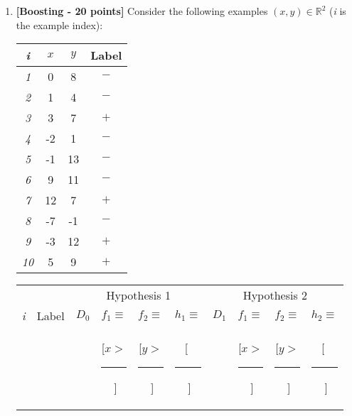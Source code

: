 \begin{enumerate}
\item {\bf [Boosting - 20 points]}
  Consider the following examples $(x,y) \in \mathbb{R}^2$ ({\em i} is the example index):
  \begin{center}
    \begin{tabular}{|c|c|c|c|}
      \hline
      {\em i}  & $x$  & $y$ & Label \\
      \hline
      {\em 1}  & 0  & 8 & $-$ \\
      \hline
      {\em 2}  & 1  & 4 & $-$ \\
      \hline
      {\em 3}  & 3  & 7 & $+$ \\
      \hline
      {\em 4}  & -2  & 1 & $-$ \\
      \hline
      {\em 5}  & -1  & 13 & $-$ \\
      \hline
      {\em 6}  & 9  & 11 & $-$ \\
      \hline
      {\em 7}  & 12 & 7 & $+$ \\
      \hline
      {\em 8}  & -7  & -1 & $-$ \\
      \hline
      {\em 9}  & -3  & 12 & $+$ \\
      \hline
      {\em 10} & 5  & 9 & $+$ \\
      \hline
    \end{tabular}
  \end{center}

    \begin{table}[!t]
      {\centering
        \begin{tabular}{|c|c||c|c|c|c||c|c|c|c|}

          \hline
          & & \multicolumn{4}{c||}{Hypothesis 1}
	  & \multicolumn{4}{c|}{Hypothesis 2} \\
          \cline{3-10}
          {\em i} & Label & $D_0$ & $f_1 \equiv $ & $f_2 \equiv $ & $h_1\equiv$ & $D_1$ &  $f_1 \equiv $ & $f_2 \equiv $ & $h_2 \equiv $ \\
          & & & [$x >$\rule[-2pt]{3mm}{0.2pt}$\;$] & [$y >$\rule[-2pt]{3mm}{0.2pt}$\;$] & [$\;$\rule[-2pt]{1cm}{0.2pt}$\;$] & & [$x >$\rule[-2pt]{3mm}{0.2pt}$\;$] & [$y >$\rule[-2pt]{3mm}{0.2pt}$\;$] & [$\;$\rule[-2pt]{1cm}{0.2pt}$\;$] \\


\end{tabular}}
\end{table}
\end{enumerate}
